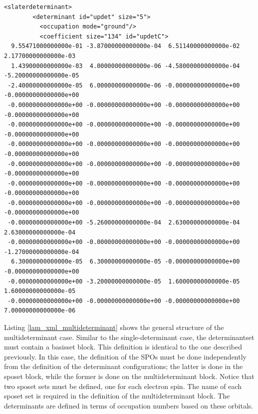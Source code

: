 {\begin{lstlisting}[style=QMCPXML,caption=``Sample XML block for the single Slater determinant case.",label=lst:lam_xml_slaterdeterminant]
      <slaterdeterminant>
        <determinant id="updet" size="5">
          <occupation mode="ground"/>
          <coefficient size="134" id="updetC">
  9.55471000000000e-01 -3.87000000000000e-04  6.51140000000000e-02  2.17700000000000e-03
  1.43900000000000e-03  4.00000000000000e-06 -4.58000000000000e-04 -5.20000000000000e-05
 -2.40000000000000e-05  6.00000000000000e-06 -0.00000000000000e+00 -0.00000000000000e+00
 -0.00000000000000e+00 -0.00000000000000e+00 -0.00000000000000e+00 -0.00000000000000e+00
 -0.00000000000000e+00 -0.00000000000000e+00 -0.00000000000000e+00 -0.00000000000000e+00
 -0.00000000000000e+00 -0.00000000000000e+00 -0.00000000000000e+00 -0.00000000000000e+00
 -0.00000000000000e+00 -0.00000000000000e+00 -0.00000000000000e+00 -0.00000000000000e+00
 -0.00000000000000e+00 -0.00000000000000e+00 -0.00000000000000e+00 -0.00000000000000e+00
 -0.00000000000000e+00 -0.00000000000000e+00 -0.00000000000000e+00 -0.00000000000000e+00
 -0.00000000000000e+00 -5.26000000000000e-04  2.63000000000000e-04  2.63000000000000e-04
 -0.00000000000000e+00 -0.00000000000000e+00 -0.00000000000000e+00 -1.27000000000000e-04
  6.30000000000000e-05  6.30000000000000e-05 -0.00000000000000e+00 -0.00000000000000e+00
 -0.00000000000000e+00 -3.20000000000000e-05  1.60000000000000e-05  1.60000000000000e-05
 -0.00000000000000e+00 -0.00000000000000e+00 -0.00000000000000e+00  7.00000000000000e-06
\end{lstlisting}
Listing \ref{lam_xml_multideterminant} shows the general structure of the multideterminant case. 
Similar to the
single-determinant case, the determinantset must contain a basisset block. This definition is
identical to the one described previously. In this case, the definition of the SPOs
must be done independently from the definition of the determinant configurations; the latter
is done in the sposet block, while the former is done on the multideterminant block. Notice
that two sposet sets must be defined, one for each electron spin. The name of each sposet set
is required in the definition of the multideterminant block. The determinants are defined in
terms of occupation numbers based on these orbitals.

}
